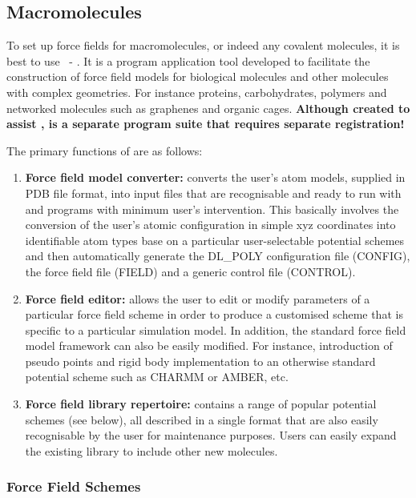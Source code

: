 \subsection{Macromolecules}

To set up force fields for macromolecules, or indeed any covalent
molecules, it is best to use \F ~- \WEF{}.  It is a program
application tool developed to facilitate the construction of force
field models for biological molecules and other molecules with complex
geometries.  For instance proteins, carbohydrates, polymers and
networked molecules such as graphenes and organic cages.  {\bf Although
created to assist \D, \F is a separate program suite that requires
separate registration!}

The primary functions of \F are as follows:
\begin{enumerate}
\item {\bf Force field model converter:} \F converts the user’s atom
models, supplied in PDB file format, into input files that are
recognisable and ready to run with \C and \D programs with minimum
user’s intervention.  This basically involves the conversion of the
user’s atomic configuration in simple xyz coordinates into identifiable
atom types base on a particular user-selectable potential schemes and
then automatically generate the DL\_POLY configuration file (CONFIG),
the force field file (FIELD) and a generic control file (CONTROL).
\item {\bf Force field editor:} \F allows the user to edit or modify
parameters of a particular force field scheme in order to produce a
customised scheme that is specific to a particular simulation model.
In addition, the standard force field model framework can also be easily
modified.  For instance, introduction of pseudo points and rigid body
implementation to an otherwise standard potential scheme such as CHARMM
or AMBER, etc.
\item {\bf Force field library repertoire:} \F contains a range of
popular potential schemes (see below), all described in a single \F
format that are also easily recognisable by the user for maintenance
purposes.  Users can easily expand the existing library to include
other new molecules.
\end{enumerate}

\subsubsection*{Force Field Schemes}

